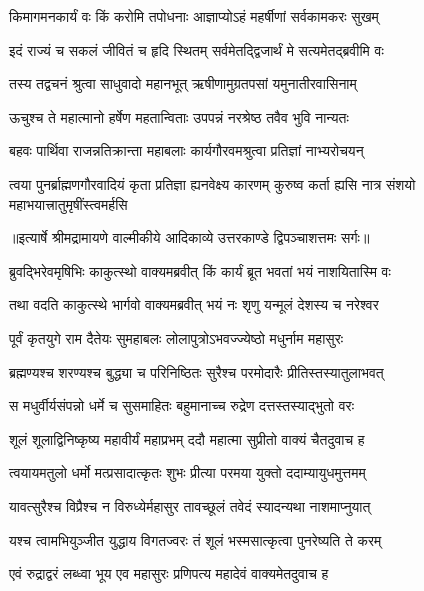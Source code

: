 \twolineshloka
{किमागमनकार्यं वः किं करोमि तपोधनाः}
{आज्ञाप्योऽहं महर्षीणां सर्वकामकरः सुखम्} %

\twolineshloka
{इदं राज्यं च सकलं जीवितं च हृदि स्थितम्}
{सर्वमेतद्द्विजार्थं मे सत्यमेतद्ब्रवीमि वः} %

\twolineshloka
{तस्य तद्वचनं श्रुत्वा साधुवादो महानभूत्}
{ऋषीणामुग्रतपसां यमुनातीरवासिनाम्} %

\twolineshloka
{ऊचुश्च ते महात्मानो हर्षेण महतान्विताः}
{उपपन्नं नरश्रेष्ठ तवैव भुवि नान्यतः} %

\twolineshloka
{बहवः पार्थिवा राजन्नतिक्रान्ता महाबलाः}
{कार्यगौरवमश्रुत्वा प्रतिज्ञां नाभ्यरोचयन्} %

\fourlineindentedshloka
{त्वया पुनर्ब्राह्मणगौरवादियं}
{ कृता प्रतिज्ञा ह्यनवेक्ष्य कारणम्}
{कुरुष्व कर्ता ह्यसि नात्र संशयो}
{ महाभयात्त्रातुमृषींस्त्वमर्हसि} %


{॥इत्यार्षे श्रीमद्रामायणे वाल्मीकीये आदिकाव्ये उत्तरकाण्डे द्विपञ्चाशत्तमः सर्गः॥}


\twolineshloka
{ब्रुवद्भिरेवमृषिभिः काकुत्स्थो वाक्यमब्रवीत्}
{किं कार्यं ब्रूत भवतां भयं नाशयितास्मि वः} %

\twolineshloka
{तथा वदति काकुत्स्थे भार्गवो वाक्यमब्रवीत्}
{भयं नः शृणु यन्मूलं देशस्य च नरेश्वर} %

\twolineshloka
{पूर्वं कृतयुगे राम दैतेयः सुमहाबलः}
{लोलापुत्रोऽभवज्ज्येष्ठो मधुर्नाम महासुरः} %

\twolineshloka
{ब्रह्मण्यश्च शरण्यश्च बुद्ध्या च परिनिष्ठितः}
{सुरैश्च परमोदारैः प्रीतिस्तस्यातुलाभवत्} %

\twolineshloka
{स मधुर्वीर्यसंपन्नो धर्मे च सुसमाहितः}
{बहुमानाच्च रुद्रेण दत्तस्तस्याद्भुतो वरः} %

\twolineshloka
{शूलं शूलाद्विनिष्कृष्य महावीर्यं महाप्रभम्}
{ददौ महात्मा सुप्रीतो वाक्यं चैतदुवाच ह} %

\twolineshloka
{त्वयायमतुलो धर्मो मत्प्रसादात्कृतः शुभः}
{प्रीत्या परमया युक्तो ददाम्यायुधमुत्तमम्} %

\twolineshloka
{यावत्सुरैश्च विप्रैश्च न विरुध्येर्महासुर}
{तावच्छूलं तवेदं स्यादन्यथा नाशमाप्नुयात्} %

\twolineshloka
{यश्च त्वामभियुञ्जीत युद्धाय विगतज्वरः}
{तं शूलं भस्मसात्कृत्वा पुनरेष्यति ते करम्} %

\twolineshloka
{एवं रुद्राद्वरं लब्ध्वा भूय एव महासुरः}
{प्रणिपत्य महादेवं वाक्यमेतदुवाच ह} %

